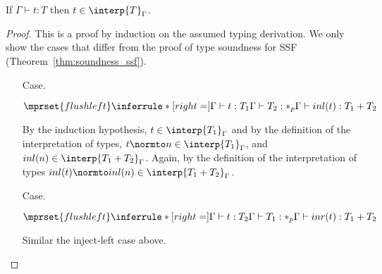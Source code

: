 \begin{thm}
  If $\Gamma \vdash t:T$ then $t \in \interp{T}_\Gamma$.
  \label{thm:soundness_ssfp}
\end{thm}
\begin{proof}
  This is a proof by induction on the assumed typing derivation.  We
  only show the cases that differ from the proof of type soundness for
  SSF (Theorem~\ref{thm:soundness_ssf}).

\begin{itemize}  
\item[Case.]\ \\
  \begin{center}
    \begin{math}
      $$\mprset{flushleft}
      \inferrule* [right=] {
        \Gamma \vdash t:T_1
	\\
	\Gamma \vdash T_2:*_p
      }{\Gamma \vdash inl(t): T_1+T_2}
    \end{math}
  \end{center}
  By the induction hypothesis, $t \in \interp{T_1}_\Gamma$ and by the definition of the 
  interpretation of types,
  $t \normto n \in \interp{T_1}_\Gamma$, and $inl(n) \in \interp{T_1 + T_2}_{\Gamma}$.  
  Again, by the definition of the interpretation of types
  $inl(t) \normto inl(n) \in \interp{T_1 + T_2}_\Gamma$.
  
\item[Case.]\ \\
  \begin{center}
    \begin{math}
      $$\mprset{flushleft}
      \inferrule* [right=] {
        \Gamma \vdash t:T_2
	\\
	\Gamma \vdash T_1:*_p
      }{\Gamma \vdash inr(t): T_1+T_2}
    \end{math}
  \end{center}
  Similar the inject-left case above.
  

\end{itemize}
\end{proof}
